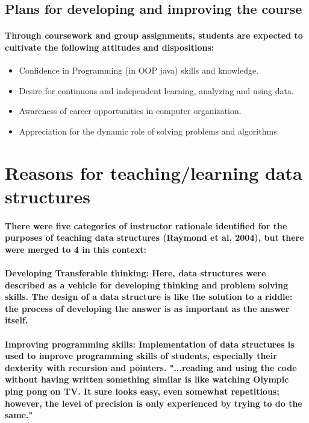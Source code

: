 \documentclass{article}
\begin{document}
\subsection{Plans for developing and improving the course}
\paragraph{Through coursework and group assignments, students are expected to cultivate the following attitudes and dispositions: } 
\begin{itemize}
    \item \cite{bennedsen2004programming}Confidence in Programming (in OOP java) skills and knowledge.

    \item Desire for continuous and independent learning, analyzing and using data.
    \item Awareness of career opportunities in computer organization.

    \item \cite{trinkle1997dynamic}Appreciation for the dynamic role of solving problems and algorithms


\end{itemize}
\section{Reasons for teaching/learning data structures}
\paragraph{There were five categories of instructor rationale identified for the\cite{lister2004dimensions} purposes of teaching data structures (Raymond et al, 2004), but there were merged to 4 in this context:}

\paragraph{Developing Transferable thinking: Here, data structures were described as a vehicle for developing thinking and problem solving skills. The design of a data structure is like the solution to a riddle: the process of developing the answer is as important as the answer itself.}

\paragraph{Improving programming skills: \cite{blank2012folk}Implementation of data structures is used to improve programming skills of students, especially their dexterity with recursion and pointers. "...reading and using the code without having written something similar is like watching Olympic ping pong on TV. It sure looks easy, even somewhat repetitious; however, the level of precision is only experienced by trying to do the same." }
\end{document}
